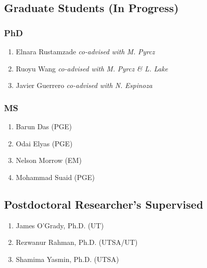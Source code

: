 \subsection*{Graduate Students (In Progress)}



\subsubsection*{PhD}
\begin{enumerate}
    \item Elnara Rustamzade \emph{co-advised with M. Pyrcz}
    \item Ruoyu Wang \emph{co-advised with M. Pyrcz \& L. Lake}
    \item Javier Guerrero \emph{co-advised with N. Espinoza}
\end{enumerate}

\subsubsection*{MS}
\begin{enumerate}
    \item Barun Das (PGE) 
    \item Odai Elyas (PGE) 
    \item Nelson Morrow (EM) 
    \item Mohammad Suaid (PGE) 
\end{enumerate}

\subsection*{Postdoctoral Researcher's Supervised}
  \begin{enumerate}
      \item James O'Grady, Ph.D. (UT)
      \item Rezwanur Rahman, Ph.D. (UTSA/UT)
      \item Shamima Yasmin, Ph.D. (UTSA)
  \end{enumerate}


